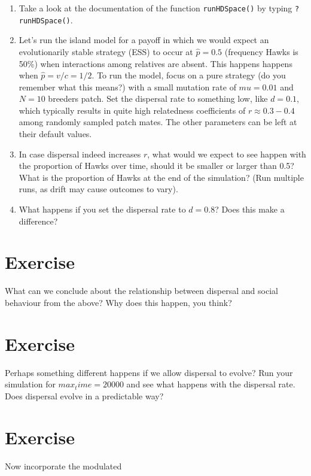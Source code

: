 \documentclass[
]{book}
\begin{document}
\begin{enumerate}
\def\labelenumi{\arabic{enumi}.}
\item
  Take a look at the documentation of the function \texttt{runHDSpace()} by typing \texttt{?runHDSpace()}.
\item
  Let's run the island model for a payoff in which we would expect an evolutionarily stable strategy (ESS) to occur at \(\hat{p}=0.5\) (frequency Hawks is 50\%) when interactions among relatives are absent. This happens happens when \(\hat{p} = v/c = 1/2\). To run the model, focus on a pure strategy (do you remember what this means?) with a small mutation rate of \(mu=0.01\) and \(N=10\) breeders patch. Set the dispersal rate to something low, like \(d=0.1\), which typically results in quite high relatedness coefficients of \(r\approx 0.3-0.4\) among randomly sampled patch mates. The other parameters can be left at their default values.
\item
  In case dispersal indeed increases \(r\), what would we expect to see happen with the proportion of Hawks over time, should it be smaller or larger than 0.5? What is the proportion of Hawks at the end of the simulation? (Run multiple runs, as drift may cause outcomes to vary).
\item
  What happens if you set the dispersal rate to \(d=0.8\)? Does this make a difference?
\end{enumerate}

\section{Exercise}\label{exercise-9}

What can we conclude about the relationship between dispersal and social behaviour from the above? Why does this happen, you think?

\section{Exercise}\label{exercise-10}

Perhaps something different happens if we allow dispersal to evolve? Run your simulation for \(max_time = 20000\) and see what happens with the dispersal rate. Does dispersal evolve in a predictable way?

\section{Exercise}\label{exercise-11}

Now incorporate the modulated
\end{document}

